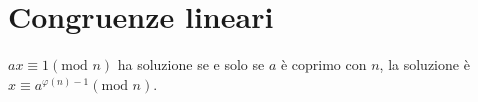 \section{Congruenze lineari}
$ax \equiv 1 (\text{mod } n)$ ha soluzione se e solo se $a$ è coprimo con $n$, la soluzione è $x \equiv a^{\varphi(n)-1} (\text{mod } n)$.
